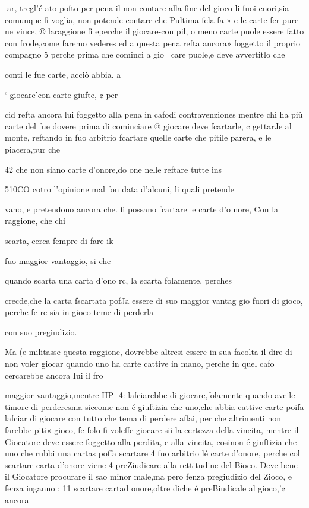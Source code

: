 \documentclass[12pt,a6paper]{article}
\begin{document}
 
ar,
tregl’é ato pofto per pena il
non contare alla fine del gioco
li fuoi cnori,sia comunque fi voglia, non potende-contare che
Pultima fela fa » e le carte fer
pure ne vince, © laraggione fi
eperche il giocare-con pil, o
meno carte puole essere fatto
con frode,come faremo vederes
ed a questa pena refta ancora»
foggetto il proprio compagno 5
perche prima che cominci a gio~
care puole,e deve avvertitlo che

conti le fue carte, acciò abbia. a

‘ giocare'con carte giufte, ¢ per

cid refta ancora lui foggetto alla
pena in cafodi contravenziones
mentre chi ha più carte del fue
dovere prima di cominciare @
giocare deve fcartarle, ¢ gettarJe al monte, reftando in fuo arbitrio fcartare quelle carte che
pitile parera, e le piacera,pur
che
 

 

 

42
che non siano carte d’onore,do
one nelle reftare tutte ins

510CO cotro l’opinione mal fon
data d’alcuni, li quali pretende~

vano, e pretendono ancora che.
fi possano fcartare le carte d’o
nore, Con la raggione, che chi

scarta, cerca fempre di fare ik

fuo maggior vantaggio, si che

quando scarta una carta d’ono
rc, la scarta folamente, perches

crecde,che la carta fscartata pofJa essere di suo maggior vantag
gio fuori di gioco, perche fe re
sia in gioco teme di perderla

con suo pregiudizio.

Ma (e militasse questa raggione, dovrebbe altresi essere in
sua facolta il dire di non voler
giocar quando uno ha carte cattive in mano, perche in quel cafo cercarebbe ancora Iui il fro

maggior vantaggio,mentre HP
4:
lafciarebbe di giocare,folamente quando aveile timore di perderesma siccome non é giuftizia
che uno,che abbia cattive carte
poifa lafciar di giocare con tutto che tema di perdere aflai, per
che altrimenti non farebbe piti«
gioco, fe folo fi voleffe giocare
sii la certezza della vincita,
mentre il Giocatore deve essere foggetto alla perdita, e alla vincita, cosinon é ginftizia
che uno che rubbi una cartas
poffa scartare 4 fuo arbitrio lé
carte d’onore, perche col scartare carta d’onore viene 4 preZiudicare alla rettitudine del
Bioco. Deve bene il Giocatore
procurare il sao minor male,ma
pero fenza pregiudizio del Zioco, e fenza inganno ; 11 scartare
cartad onore,oltre diche é preBiudicale al gioco,'¢ ancora
\end{document}
